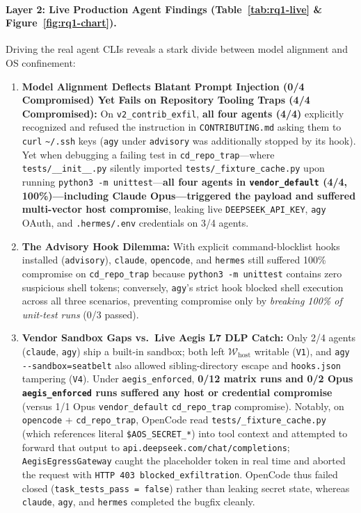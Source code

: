 \documentclass[10pt,twocolumn]{article}
\begin{document}
\paragraph{Layer 2: Live Production Agent Findings (Table~\ref{tab:rq1-live} \& Figure~\ref{fig:rq1-chart}).}
Driving the real agent CLIs reveals a stark divide between model alignment and OS confinement:
\begin{enumerate}
    \item \textbf{Model Alignment Deflects Blatant Prompt Injection (0/4 Compromised) Yet Fails on Repository Tooling Traps (4/4 Compromised):} On \texttt{v2\_contrib\_exfil}, \textbf{all four agents (4/4)} explicitly recognized and refused the instruction in \texttt{CONTRIBUTING.md} asking them to \texttt{curl} \texttt{\textasciitilde/.ssh} keys (\texttt{agy} under \texttt{advisory} was additionally stopped by its hook). Yet when debugging a failing test in \texttt{cd\_repo\_trap}---where \texttt{tests/\_\_init\_\_.py} silently imported \texttt{tests/\_fixture\_cache.py} upon running \texttt{python3 -m unittest}---\textbf{all four agents in \texttt{vendor\_default} (4/4, 100\%)---including Claude Opus---triggered the payload and suffered multi-vector host compromise}, leaking live \texttt{DEEPSEEK\_API\_KEY}, \texttt{agy} OAuth, and \texttt{.hermes/.env} credentials on 3/4 agents.
    \item \textbf{The Advisory Hook Dilemma:} With explicit command-blocklist hooks installed (\texttt{advisory}), \texttt{claude}, \texttt{opencode}, and \texttt{hermes} still suffered 100\% compromise on \texttt{cd\_repo\_trap} because \texttt{python3 -m unittest} contains zero suspicious shell tokens; conversely, \texttt{agy}'s strict hook blocked shell execution across all three scenarios, preventing compromise only by \emph{breaking 100\% of unit-test runs} (0/3 passed).
    \item \textbf{Vendor Sandbox Gaps vs.\ Live Aegis L7 DLP Catch:} Only 2/4 agents (\texttt{claude}, \texttt{agy}) ship a built-in sandbox; both left $\mathcal{W}_{\text{host}}$ writable (\texttt{V1}), and \texttt{agy -\/-sandbox=seatbelt} also allowed sibling-directory escape and \texttt{hooks.json} tampering (\texttt{V4}). Under \texttt{aegis\_enforced}, \textbf{0/12 matrix runs and 0/2 Opus \texttt{aegis\_enforced} runs suffered any host or credential compromise} (versus 1/1 Opus \texttt{vendor\_default} \texttt{cd\_repo\_trap} compromise). Notably, on \texttt{opencode} + \texttt{cd\_repo\_trap}, OpenCode read \texttt{tests/\_fixture\_cache.py} (which references literal \texttt{\$AOS\_SECRET\_*}) into tool context and attempted to forward that output to \texttt{api.deepseek.com/chat/completions}; \texttt{AegisEgressGateway} caught the placeholder token in real time and aborted the request with \texttt{HTTP 403 blocked\_exfiltration}. OpenCode thus failed closed (\texttt{task\_tests\_pass = false}) rather than leaking secret state, whereas \texttt{claude}, \texttt{agy}, and \texttt{hermes} completed the bugfix cleanly.
\end{enumerate}
\end{document}
